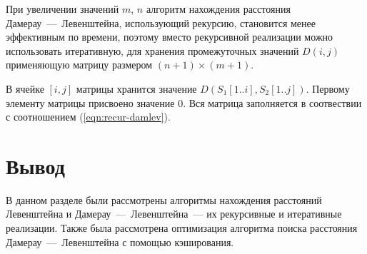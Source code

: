 При увеличении значений $m$, $n$ алгоритм нахождения расстояния Дамерау~---~Левенштейна, использующий рекурсию, становится менее эффективным по времени, поэтому вместо рекурсивной реализации можно использовать итеративную, для хранения промежуточных значений $D(i, j)$ применяющую матрицу размером $(n + 1) \times (m + 1)$.

В ячейке $[i, j]$ матрицы хранится значение $D(S_1[1..i], S_2[1..j])$.
Первому элементу матрицы присвоено значение $0$.
Вся матрица заполняется в соотвествии с соотношением (\ref{eqn:recur-damlev}).

\section*{Вывод}

В данном разделе были рассмотрены алгоритмы нахождения расстояний Левенштейна и Дамерау~---~Левенштейна~--- их рекурсивные и итеративные реализации.
Также была рассмотрена оптимизация алгоритма поиска расстояния Дамерау~---~Левенштейна с помощью кэширования.